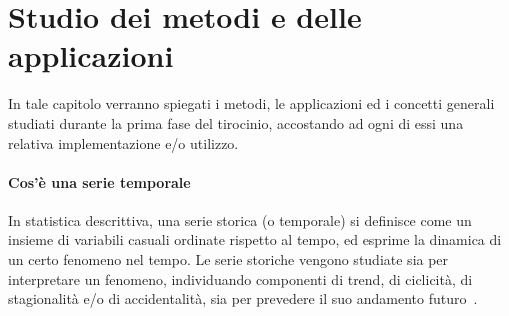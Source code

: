 \section{Studio dei metodi e delle applicazioni}
In tale capitolo verranno spiegati i metodi, le applicazioni ed i concetti 
generali studiati durante la prima fase del tirocinio, accostando ad ogni 
di essi una relativa implementazione e/o utilizzo.

\paragraph{Cos'è una serie temporale} In statistica descrittiva, una serie 
storica (o temporale) si definisce come un insieme di variabili 
casuali ordinate rispetto al tempo, ed esprime la dinamica di un certo 
fenomeno nel tempo. Le serie storiche vengono studiate sia per 
interpretare un fenomeno, individuando componenti di trend, di ciclicità, 
di stagionalità e/o di accidentalità, sia per prevedere il suo 
andamento futuro~\cite{wiki:serie_storica}.